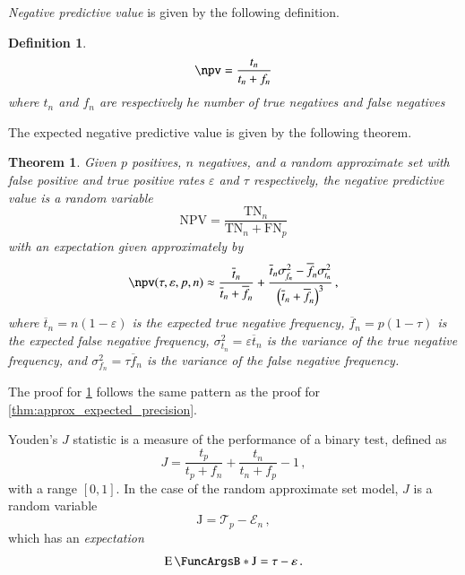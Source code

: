 \documentclass[10pt,final,hidelinks]{article}
\numberwithin{equation}{section}
\newcommand{\p}{p}
\newcommand{\n}{n}
\newcommand{\NPV}{\RV{NPV}}
\newcommand{\FPR}{\mathcal{E}}
\newcommand{\TPR}{\mathcal{T}}
\newcommand{\FN}{\RV{FN}}
\newcommand{\TN}{\RV{TN}}
\newcommand{\tprate}{\tau}
\newcommand{\fprate}{\varepsilon}
\newcommand{\RV}[1]{\mathrm{#1}}
\newcommand{\envnumstyle}{chapter}
\renewcommand{\envnumstyle}{chapter}
\renewcommand{\envnumstyle}{section}
\theoremstyle{plain}
\newtheorem{theorem}{Theorem}[\envnumstyle]
\newtheorem{definition}{Definition}[\envnumstyle]
\begin{document}
\emph{Negative predictive value} is given by the following definition.
\begin{definition}
	\begin{equation}
	\npv = \frac{t_n}{t_n + f_n}
	\end{equation}
	where $t_n$ and $f_n$ are respectively he number of \emph{true negatives} 
	and \emph{false negatives} 
\end{definition}
The expected negative predictive value is given by the following theorem.
\begin{theorem}
	\label{thm:npv_approx}
	Given $\p$ positives, $\n$ negatives, and a random approximate set with false positive and true positive rates $\fprate$ and $\tprate$ respectively, the negative predictive value is a \emph{random variable}
	\begin{equation}
	\NPV = \frac{\TN_{\n}}{\TN_{\n} + \FN_{\p}}
	\end{equation}
	with an \emph{expectation} given approximately by
	\begin{equation}
	\label{eq:npv_approx}
	\npv(\tprate, \fprate , \p, \n) \approx 
	\frac{\overline{t}_n}{\overline{t}_n + \overline{f}_{\!n}} +
	\frac{\overline{t}_n \sigma_{\!f_n}^2 - \overline{f}_{\!n} 
		\sigma_{\!t_n}^2}{\left(\overline{t}_n + \overline{f}_{\!n}\right)^3}\,,
	\end{equation}
	where $\overline{t}_\n = \n(1-\fprate)$ is the expected \emph{true negative} frequency, $\overline{f}_{\!\n} =  \p(1-\tprate)$ is the expected \emph{false negative} frequency, $\sigma_{\!t_\n}^2 = \fprate \overline{t}_\n$ is the variance of the \emph{true negative} frequency, and $\sigma_{\!f_\n}^2 = \tprate\overline{f}_{\!\n}$ is the variance of the \emph{false negative} frequency.
\end{theorem}
The proof for \cref{thm:npv_approx} follows the same pattern as the proof for \cref{thm:approx_expected_precision}.

Youden's $J$ statistic is a measure of the performance of a binary test, defined as
\begin{equation}
J = \frac{t_p}{t_p + f_n} + \frac{t_n}{t_n + f_p} - 1\,,
\end{equation}
with a range $[0,1]$.
In the case of the random approximate set model, $J$ is a random variable
\begin{equation}
\RV{J} = \TPR_\p - \FPR_\n\,,
\end{equation}
which has an \emph{expectation}
\begin{equation}
\Expect{\RV{J}} = \tprate - \fprate\,.
\end{equation}
\end{document}
